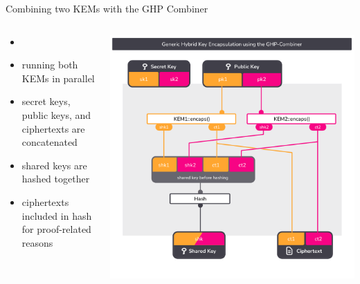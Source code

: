\begin{frame}{Combining two KEMs with the GHP Combiner}
  \begin{columns}[c]
    \begin{column}{.4\linewidth}
      \small
      \begin{itemize}
        \item {} \citeGhp
        \item running both KEMs in parallel
        \item secret keys, public keys, and ciphertexts are concatenated
        \item shared keys are hashed together
        \item ciphertexts included in hash for proof-related reasons
      \end{itemize}
    \end{column}
    \begin{column}{.55\linewidth}
     \includegraphics[width=\linewidth,page=1,clip=true,trim={29 43  29 58}]{graphics/rosenpass-encapsulation-combiner.pdf}
    \end{column}
  \end{columns}
\end{frame}


